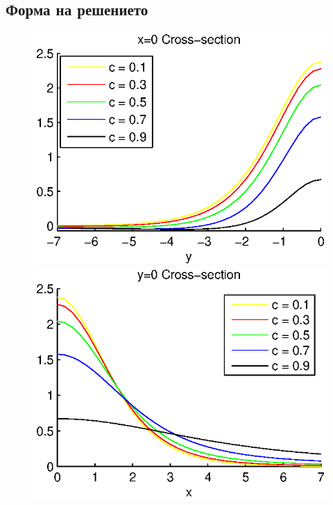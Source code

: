 \documentclass{article}
\begin{document}
\subsection{Форма на решението}

\begin{figure}[ht]
	\begin{minipage}[b]{0.5\linewidth}
		\raggedleft
		\includegraphics[width=\linewidth]{../EllipticEquationSJC/cross-sections/c=01__09beta=1x=0.eps}
	\end{minipage}	
	\begin{minipage}[b]{0.5\linewidth}
		\raggedright
		 \includegraphics[width=\linewidth]{../EllipticEquationSJC/cross-sections/c=01__09beta=1y=0.eps}

\end{minipage}
\end{figure}
\end{document}
